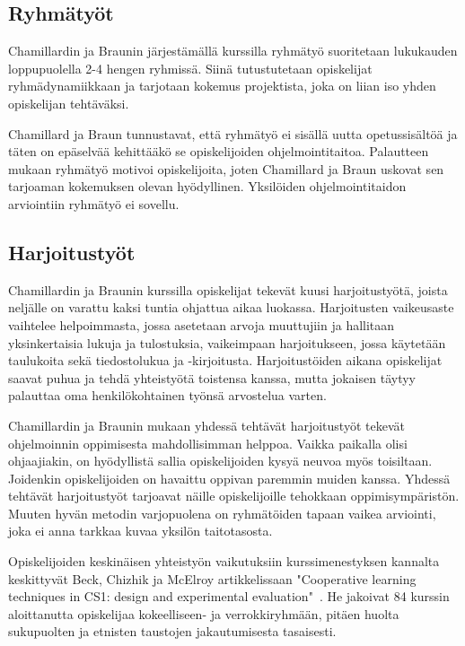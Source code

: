 \documentclass[finnish]{../tktltiki2}
\theoremstyle{definition}
\theoremstyle{remark}
\begin{document}
\subsection{Ryhmätyöt}

Chamillardin ja Braunin järjestämällä kurssilla ryhmätyö suoritetaan lukukauden loppupuolella 2-4 hengen ryhmissä. Siinä tutustutetaan opiskelijat ryhmädynamiikkaan ja tarjotaan kokemus projektista, joka on liian iso yhden opiskelijan tehtäväksi.

Chamillard ja Braun tunnustavat, että ryhmätyö ei sisällä uutta opetussisältöä ja täten on epäselvää kehittääkö se opiskelijoiden ohjelmointitaitoa. Palautteen mukaan ryhmätyö motivoi opiskelijoita, joten Chamillard ja Braun uskovat sen tarjoaman kokemuksen olevan hyödyllinen. Yksilöiden ohjelmointitaidon arviointiin ryhmätyö ei sovellu.

\subsection{Harjoitustyöt}

Chamillardin ja Braunin kurssilla opiskelijat tekevät kuusi harjoitustyötä, joista neljälle on varattu kaksi tuntia ohjattua aikaa luokassa. Harjoitusten vaikeusaste vaihtelee helpoimmasta, jossa asetetaan arvoja muuttujiin ja hallitaan yksinkertaisia lukuja ja tulostuksia, vaikeimpaan harjoitukseen, jossa käytetään taulukoita sekä tiedostolukua ja -kirjoitusta. Harjoitustöiden aikana opiskelijat saavat puhua ja tehdä yhteistyötä toistensa kanssa, mutta jokaisen täytyy palauttaa oma henkilökohtainen työnsä arvostelua varten.

Chamillardin ja Braunin mukaan yhdessä tehtävät harjoitustyöt tekevät ohjelmoinnin oppimisesta mahdollisimman helppoa. Vaikka paikalla olisi ohjaajiakin, on hyödyllistä sallia opiskelijoiden kysyä neuvoa myös toisiltaan. Joidenkin opiskelijoiden on havaittu oppivan paremmin muiden kanssa. Yhdessä tehtävät harjoitustyöt tarjoavat näille opiskelijoille tehokkaan oppimisympäristön. Muuten hyvän metodin varjopuolena on ryhmätöiden tapaan vaikea arviointi, joka ei anna tarkkaa kuvaa yksilön taitotasosta.

Opiskelijoiden keskinäisen yhteistyön vaikutuksiin kurssimenestyksen kannalta keskittyvät Beck, Chizhik ja McElroy artikkelissaan "Cooperative learning techniques in CS1: design and experimental evaluation"~\cite{BCM05}. He jakoivat 84 kurssin aloittanutta opiskelijaa kokeelliseen- ja verrokkiryhmään, pitäen huolta sukupuolten ja etnisten taustojen jakautumisesta tasaisesti.
\end{document}
